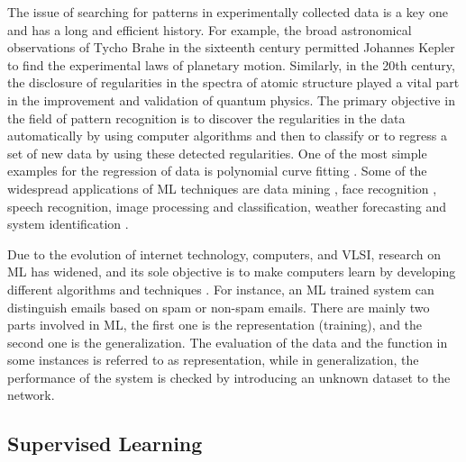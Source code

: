The issue of searching for patterns in experimentally collected data is a key one and has a long and efficient history. For example, the broad astronomical observations of Tycho Brahe in the sixteenth century permitted Johannes Kepler to find the experimental laws of planetary motion. Similarly, in the 20th century, the disclosure of regularities in the spectra of atomic structure played a vital part in the improvement and validation of quantum physics. The primary objective in the field of pattern recognition is to discover the regularities in the data automatically by using computer algorithms and then to classify or to regress a set of new data by using these detected regularities. One of the most simple examples for the regression of data is polynomial curve fitting \cite{motulsky1987fitting}. Some of the widespread applications of  \ac{ML} techniques are data mining \cite{kotsiantis2007supervised}, face recognition \cite{Osuna1997Training}, speech recognition, image processing and classification, weather forecasting and system identification \cite{bhattacharya2015relevance,Bongard2007automated}.

Due to the evolution of internet technology, computers, and VLSI, research on \ac{ML} has widened, and its sole objective is to make computers learn by developing different algorithms and techniques \cite{bhattacharya2015relevance}. For instance, an \ac{ML} trained system can distinguish emails based on spam or non-spam emails. There are mainly two parts involved in \ac{ML}, the first one is the representation (training), and the second one is the generalization. The evaluation of the data and the function in some instances is referred to as representation, while in generalization, the performance of the system is checked by introducing an unknown dataset to the network. 

\subsection{Supervised Learning}

